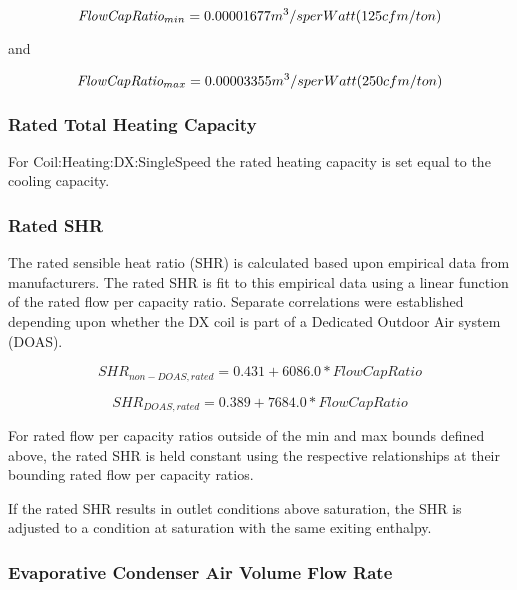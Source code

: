 \begin{equation}
\emph{FlowCapRatio\(_{min}\)} = 0.00001677 m^{3}/s per Watt (125 cfm/ton)
\end{equation}

and

\begin{equation}
\emph{FlowCapRatio\(_{max}\)} = 0.00003355 m^{3}/s per Watt (250 cfm/ton)
\end{equation}

\subsubsection{Rated Total Heating Capacity}\label{rated-total-heating-capacity-2}

For Coil:Heating:DX:SingleSpeed the rated heating capacity is set equal to the cooling capacity.

\subsubsection{Rated SHR}\label{rated-shr}

The rated sensible heat ratio (SHR) is calculated based upon empirical data from manufacturers. The rated SHR is fit to this empirical data using a linear function of the rated flow per capacity ratio. Separate correlations were established depending upon whether the DX coil is part of a Dedicated Outdoor Air system (DOAS).

\begin{equation}
SHR_{non-DOAS,rated} = 0.431 + 6086.0 * FlowCapRatio
\end{equation}

\begin{equation}
SHR_{DOAS,rated} = 0.389 + 7684.0 * FlowCapRatio
\end{equation}

For rated flow per capacity ratios outside of the min and max bounds defined above, the rated SHR is held constant using the respective relationships at their bounding rated flow per capacity ratios.

If the rated SHR results in outlet conditions above saturation, the SHR is adjusted to a condition at saturation with the same exiting enthalpy.

\subsubsection{Evaporative Condenser Air Volume Flow Rate}\label{evaporative-condenser-air-volume-flow-rate}

